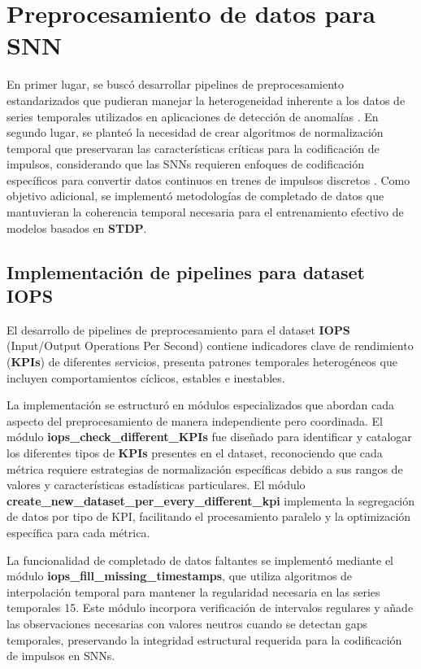 \section{Preprocesamiento de datos para SNN}

En primer lugar, se buscó desarrollar pipelines de preprocesamiento estandarizados que pudieran manejar la heterogeneidad inherente a los datos de series temporales utilizados en aplicaciones de detección de anomalías \cite{milvus2025anomaly}. En segundo lugar, se planteó la necesidad de crear algoritmos de normalización temporal que preservaran las características críticas para la codificación de impulsos, considerando que las SNNs requieren enfoques de codificación específicos para convertir datos continuos en trenes de impulsos discretos \cite{lv_efficient_2024}. Como objetivo adicional, se implementó metodologías de completado de datos que mantuvieran la coherencia temporal necesaria para el entrenamiento efectivo de modelos basados en \textbf{STDP}.

\subsection{Implementación de pipelines para dataset IOPS}

El desarrollo de pipelines de preprocesamiento para el dataset \textbf{IOPS} (Input/Output Operations Per Second) contiene indicadores clave de rendimiento (\textbf{KPIs}) de diferentes servicios, presenta patrones temporales heterogéneos que incluyen comportamientos cíclicos, estables e inestables. 

La implementación se estructuró en módulos especializados que abordan cada aspecto del preprocesamiento de manera independiente pero coordinada. El módulo \textbf{iops\_check\_different\_KPIs} fue diseñado para identificar y catalogar los diferentes tipos de \textbf{KPIs} presentes en el dataset, reconociendo que cada métrica requiere estrategias de normalización específicas debido a sus rangos de valores y características estadísticas particulares. El módulo \textbf{create\_new\_dataset\_per\_every\_different\_kpi} implementa la segregación de datos por tipo de KPI, facilitando el procesamiento paralelo y la optimización específica para cada métrica. 

La funcionalidad de completado de datos faltantes se implementó mediante el módulo \textbf{iops\_fill\_missing\_timestamps}, que utiliza algoritmos de interpolación temporal para mantener la regularidad necesaria en las series temporales 15. Este módulo incorpora verificación de intervalos regulares y añade las observaciones necesarias con valores neutros cuando se detectan gaps temporales, preservando la integridad estructural requerida para la codificación de impulsos en SNNs. 

